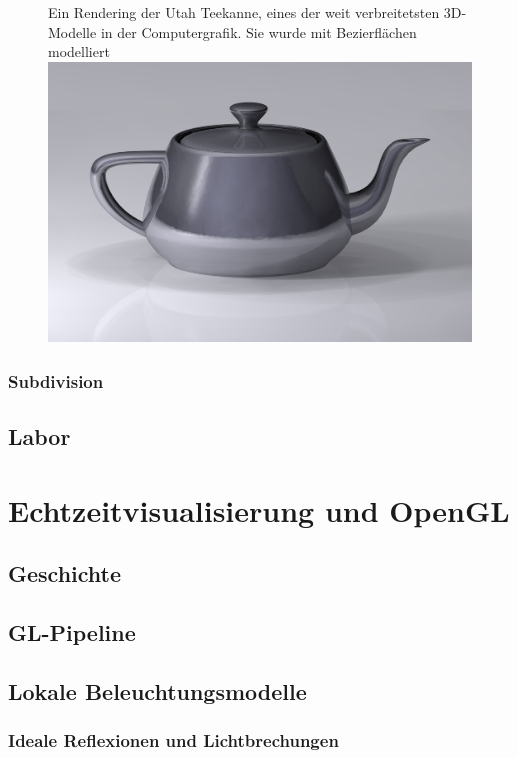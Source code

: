 \documentclass[]{article}
\begin{document}
 


\begin{figure}[H]
\centering
Ein Rendering der Utah Teekanne, eines der weit verbreitetsten 3D-Modelle in der Computergrafik. Sie wurde mit Bezierflächen modelliert\\
\includegraphics[scale=0.1]{Utah_teapot.png}
\end{figure}

\subsubsection{Subdivision}


\subsection{Labor}


\section{Echtzeitvisualisierung und OpenGL}
\subsection{Geschichte}
\subsection{GL-Pipeline}
\subsection{Lokale Beleuchtungsmodelle}
\subsubsection{Ideale Reflexionen und Lichtbrechungen}
\end{document}
